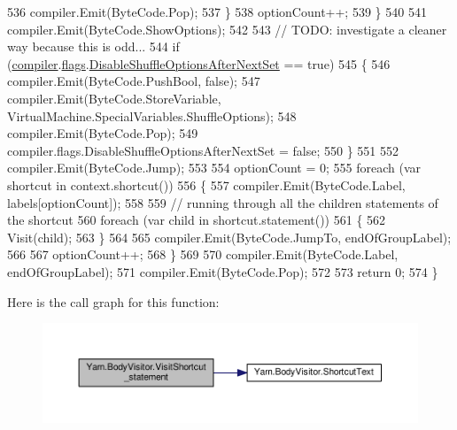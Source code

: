 \begin{DoxyCode}
536                     compiler.Emit(ByteCode.Pop);
537                 \}
538                 optionCount++;
539             \}
540 
541             compiler.Emit(ByteCode.ShowOptions);
542 
543             \textcolor{comment}{// TODO: investigate a cleaner way because this is odd...}
544             \textcolor{keywordflow}{if} (\hyperlink{a00034_a39d71c6de5e1c9f7d2f78ac2ccd5743d}{compiler}.\hyperlink{a00028_aeba873449ff9fb1c6d731ff7eb25f0a0}{flags}.\hyperlink{a00028_ae27568d71aa82edfd7841d425969a4fb}{DisableShuffleOptionsAfterNextSet}
       == \textcolor{keyword}{true})
545             \{
546                 compiler.Emit(ByteCode.PushBool, \textcolor{keyword}{false});
547                 compiler.Emit(ByteCode.StoreVariable, VirtualMachine.SpecialVariables.ShuffleOptions);
548                 compiler.Emit(ByteCode.Pop);
549                 compiler.flags.DisableShuffleOptionsAfterNextSet = \textcolor{keyword}{false};
550             \}
551 
552             compiler.Emit(ByteCode.Jump);
553 
554             optionCount = 0;
555             \textcolor{keywordflow}{foreach} (var shortcut \textcolor{keywordflow}{in} context.shortcut())
556             \{
557                 compiler.Emit(ByteCode.Label, labels[optionCount]);
558 
559                 \textcolor{comment}{// running through all the children statements of the shortcut}
560                 \textcolor{keywordflow}{foreach} (var child \textcolor{keywordflow}{in} shortcut.statement())
561                 \{
562                     Visit(child);
563                 \}
564 
565                 compiler.Emit(ByteCode.JumpTo, endOfGroupLabel);
566 
567                 optionCount++;
568             \}
569 
570             compiler.Emit(ByteCode.Label, endOfGroupLabel);
571             compiler.Emit(ByteCode.Pop);
572 
573             \textcolor{keywordflow}{return} 0;
574         \}
\end{DoxyCode}


Here is the call graph for this function\-:
\nopagebreak
\begin{figure}[H]
\begin{center}
\leavevmode
\includegraphics[width=350pt]{a00034_ad1576a22d74304c3155a0c2fa91be5b9_cgraph}
\end{center}
\end{figure}



